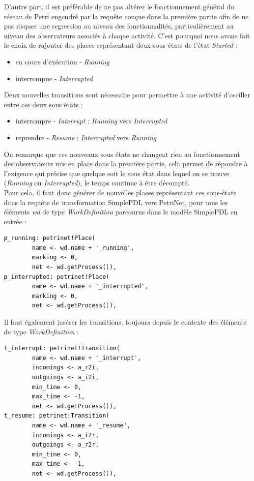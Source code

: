D'autre part, il est préférable de ne pas altérer le fonctionnement général du réseau de Petri engendré par la requête conçue dans la première partie afin de ne pas risquer une regression au niveau des fonctionnalités, particulièrement au niveau des observateurs associés à chaque activité. C'est pourquoi nous avons fait le choix de rajouter des places représentant deux sous états de l'état \textit{Started} :
\begin{itemize}
\item en cours d'exécution - \textit{Running}
\item interrompue - \textit{Interrupted}
\end{itemize}
Deux nouvelles transitions sont nécessaire pour permettre à une activité d'osciller entre ces deux sous états :
\begin{itemize}
\item interrompre - \textit{Interrupt} : \textit{Running} vers \textit{Interrupted}
\item reprendre - \textit{Resume} : \textit{Interrupted} vers \textit{Running}
\end{itemize}
On remarque que ces nouveaux sous états ne changent rien au fonctionnement des observateurs mis en place dans la première partie, cela permet de répondre à l'exigence qui précise que quelque soit le sous état dans lequel on se trouve (\textit{Running} ou \textit{Interrupted}), le temps continue à être décompté.\\

Pour cela, il faut donc générer de nouvelles places représentant ces sous-états dans la requête de transformation SimplePDL vers PetriNet, pour tous les éléments \textit{wd} de type \textit{WorkDefinition} parcourus dans le modèle SimplePDL en entrée :
\begin{verbatim}
p_running: petrinet!Place(
        name <- wd.name + '_running',
        marking <- 0,
        net <- wd.getProcess()),
p_interrupted: petrinet!Place(
        name <- wd.name + '_interrupted',
        marking <- 0,
        net <- wd.getProcess()),
\end{verbatim}

Il faut également insérer les transitions, toujours depuis le contexte des éléments de type \textit{WorkDefinition} :
\begin{verbatim}
t_interrupt: petrinet!Transition(
        name <- wd.name + '_interrupt',
        incomings <- a_r2i,
        outgoings <- a_i2i,
        min_time <- 0,
        max_time <- -1,
        net <- wd.getProcess()),
t_resume: petrinet!Transition(
        name <- wd.name + '_resume',
        incomings <- a_i2r,
        outgoings <- a_r2r,
        min_time <- 0,
        max_time <- -1,
        net <- wd.getProcess()),
\end{verbatim}

